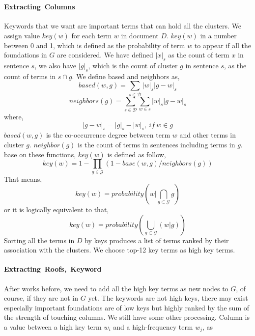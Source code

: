 \\ \\
\textbf{Extracting\ Columns}\\ \\
Keywords that we want are important terms that can hold all the clusters. We assign value $key(w)$ for each term $w$ in document $D$. $key(w)$ in a number between 0 and 1, which is defined as the probability of term $w$ to appear if all the foundations in $G$ are considered. We have defined $|x|_s$ as the count of term $x$ in sentence $s$, we also have $|g|_s$, which is the count of cluster $g$ in sentence $s$, as the count of terms in $s\cap g$. We define based and neighbors as,
\begin{displaymath}
based(w,g) = \sum_{s \in \mathcal{D}}|w|_s|g-w|_s
\end{displaymath}
\begin{displaymath}
neighbors(g) = \sum_{s\in \mathcal{D}}\sum_{w\in s}|w|_s|g-w|_s
\end{displaymath}
where,
\begin{displaymath}
|g-w|_s = |g|_s - |w|_s,\ if \ w \in g
\end{displaymath}
$based(w,g)$ is the co-occurrence degree between term $w$ and other terms in cluster $g$. $neighbor(g)$ is the count of terms in sentences including terms in $g$.\\
base on these functions, $key(w)$ is defined as follow,
\begin{displaymath}
key(w)=1-\prod_{g\in \mathcal{G}}(1-base(w,g)/neighbors(g))
\end{displaymath}
That means,
\begin{displaymath}
key(w) = probability(w|\bigcap_{g \subset \mathcal{G}}g)
\end{displaymath}
or it is logically equivalent to that,
\begin{displaymath}
key(w) = probability(\bigcup_{g\subset \mathcal{G}}(w|g))
\end{displaymath}
Sorting all the terms in $D$ by keys produces a list of terms ranked by their association with the clusters. We choose top-12 key terms as high key terms.\\ \\
\textbf{Extracting\ Roofs,\ Keyword}\\ \\
After works before, we need to add all the high key terms as new nodes to $G$, of course, if they are not in $G$ yet. The keywords are not high keys, there may exist especially important foundations are of low keys but highly ranked by the sum of the strength of touching columns. We still have some other processing. Column is a value between a high key term $w_i$ and a high-frequency term $w_j$, as

